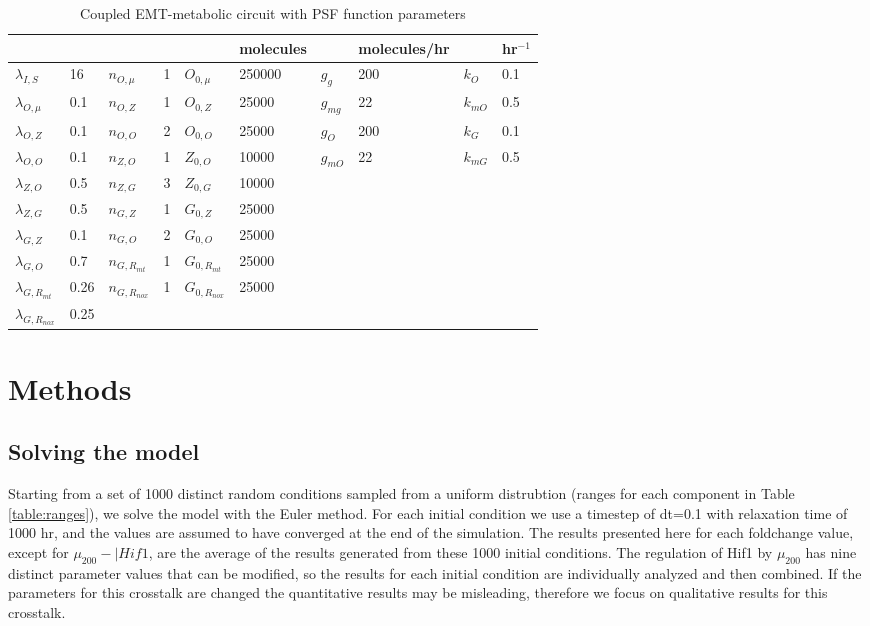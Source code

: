 \documentclass{article}
\begin{document}
\begin{table}[ht]
\begin{tabular}{ll|ll|ll|ll|ll|}
                &     &                     &    &               &  molecules & & molecules/hr  & & hr$^{-1}$\\
                \hline
$\lambda_{I,S} $ & 16&        $n_{O,\mu} $& 1&      $O_{0,\mu}$ & 250000&  $g_g$ & 200&   $k_O $& 0.1\\
$\lambda_{O,\mu}$ & 0.1&      $n_{O,Z} $& 1&        $O_{0,Z}$ & 25000&     $g_{mg}$ & 22& $k_{mO}$ & 0.5\\
$\lambda_{O,Z} $& 0.1&        $n_{O,O} $& 2&        $O_{0,O}$ & 25000&     $g_{O} $& 200& $k_G$ & 0.1\\
$\lambda_{O,O}$ & 0.1&        $n_{Z,O}$ & 1&        $Z_{0,O} $& 10000&     $g_{mO}$ & 22& $k_{mG}$ & 0.5\\
$\lambda_{Z,O}$ & 0.5&        $n_{Z,G} $& 3&        $Z_{0,G}$ & 10000&              &  & & \\
$\lambda_{Z,G}$ & 0.5&        $n_{G,Z}$ & 1 &       $G_{0,Z}$ & 25000&  &  & & \\
$\lambda_{G,Z}$ & 0.1&        $n_{G,O}$ & 2&        $G_{0,O}$ & 25000&  &  & & \\
$\lambda_{G,O}$ & 0.7&        $n_{G,R_{mt}}$ & 1&   $G_{0,R_{mt}}$ & 25000&  &  & & \\
$\lambda_{G,R_{mt}}$ & 0.26&  $n_{G,R_{nox}}$ & 1&  $G_{0,R_{nox}}$ & 25000&  &  & & \\
$\lambda_{G,R_{nox}} $& 0.25& & & & & & & & \\

\end{tabular}
\caption{Coupled EMT-metabolic circuit with PSF function parameters}
\label{table:PSFparams}
\end{table}
\FloatBarrier

\section{Methods}


\FloatBarrier
\subsection{Solving the model}
Starting from a set of 1000 distinct random conditions sampled from a uniform distrubtion (ranges for each component in Table \ref{table:ranges}), we solve the model with the Euler method.
For each initial condition we use a timestep of dt=0.1 with relaxation time of 1000 hr, and the values are assumed to have converged at the end of the simulation. 
The results presented here for each foldchange value, except for $\mu_{200}-| Hif1$, are the average of the results generated from these 1000 initial conditions. 
The regulation of Hif1 by $\mu_{200}$ has nine distinct parameter values that can be modified, so the results for each initial condition are individually analyzed and then combined. 
If the parameters for this crosstalk are changed the quantitative results may be misleading, therefore we focus on qualitative results for this crosstalk. 
\end{document}
